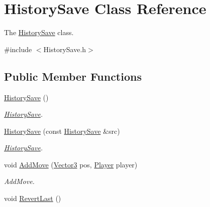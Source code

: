 \hypertarget{classHistorySave}{\section{History\-Save Class Reference}
\label{classHistorySave}
}


The \hyperlink{classHistorySave}{History\-Save} class.  




{\ttfamily \#include $<$History\-Save.\-h$>$}

\subsection*{Public Member Functions}
\begin{DoxyCompactItemize}
\item 
\hypertarget{classHistorySave_a1f76c15dd7a3b9e27a8c66897141ee16}{\hyperlink{classHistorySave_a1f76c15dd7a3b9e27a8c66897141ee16}{History\-Save} ()}\label{classHistorySave_a1f76c15dd7a3b9e27a8c66897141ee16}

\begin{DoxyCompactList}\small\item\em \hyperlink{classHistorySave}{History\-Save}. \end{DoxyCompactList}\item 
\hyperlink{classHistorySave_ac0766707b25e837d00e6e4b48bf2860c}{History\-Save} (const \hyperlink{classHistorySave}{History\-Save} \&src)
\begin{DoxyCompactList}\small\item\em \hyperlink{classHistorySave}{History\-Save}. \end{DoxyCompactList}\item 
void \hyperlink{classHistorySave_a4d10cac993d69d8f98f9c32eb7ae4a2d}{Add\-Move} (\hyperlink{structVector3}{Vector3} pos, \hyperlink{classPlayer}{Player} player)
\begin{DoxyCompactList}\small\item\em Add\-Move. \end{DoxyCompactList}\item 
\hypertarget{classHistorySave_a4adce01fc1a4deb3a80d7ac5e3a38860}{void \hyperlink{classHistorySave_a4adce01fc1a4deb3a80d7ac5e3a38860}{Revert\-Last} ()}\label{classHistorySave_a4adce01fc1a4deb3a80d7ac5e3a38860}


\end{DoxyCompactItemize}
